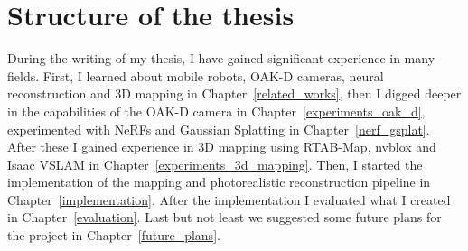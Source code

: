 \section{Structure of the thesis}

During the writing of my thesis, I have gained significant experience in many fields. First, I learned about mobile robots, OAK-D cameras, neural reconstruction and 3D mapping in Chapter~\ref{related_works}, then I digged deeper in the capabilities of the OAK-D camera in Chapter~\ref{experiments_oak_d}, experimented with NeRFs and Gaussian Splatting in Chapter~\ref{nerf_gsplat}. After these I gained experience in 3D mapping using RTAB-Map, nvblox and Isaac VSLAM in Chapter~\ref{experiments_3d_mapping}. Then, I started the implementation of the mapping and photorealistic reconstruction pipeline in Chapter~\ref{implementation}. After the implementation I evaluated what I created in Chapter~\ref{evaluation}. Last but not least we suggested some future plans for the project in Chapter~\ref{future_plans}.
